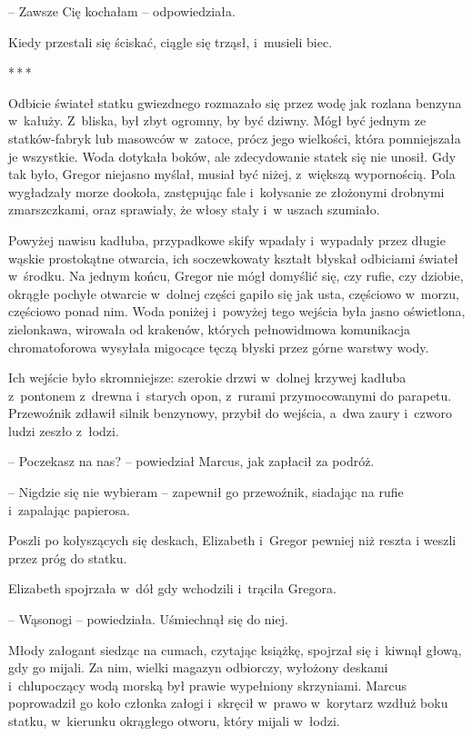 \documentclass[oneside,polish,12pt,sfheadings]{mwbk}
\newcommand{\threeast}{\bigskip\par\centerline{*\,*\,*}\medskip\par}%
\begin{document}
-- Zawsze Cię kochałam -- odpowiedziała.

Kiedy przestali się ściskać, ciągle się trząsł, i~musieli biec.

\threeast

Odbicie świateł statku gwiezdnego rozmazało się przez wodę jak rozlana
benzyna w~kałuży. Z~bliska, był zbyt ogromny, by być dziwny. Mógł być
jednym ze statków-fabryk lub masowców w~zatoce, prócz jego wielkości,
która pomniejszała je wszystkie. Woda dotykała boków, ale zdecydowanie
statek się nie unosił. Gdy tak było, Gregor niejasno myślał, musiał być
niżej, z~większą wypornością. Pola wygładzały morze dookoła, zastępując
fale i~kołysanie ze złożonymi drobnymi zmarszczkami, oraz sprawiały, że
włosy stały i~w uszach szumiało.

Powyżej nawisu kadłuba, przypadkowe skify wpadały i~wypadały przez
długie wąskie prostokątne otwarcia, ich soczewkowaty kształt błyskał
odbiciami świateł w~środku. Na jednym końcu, Gregor nie mógł domyślić
się, czy rufie, czy dziobie, okrągłe pochyłe otwarcie w~dolnej części
gapiło się jak usta, częściowo w~morzu, częściowo ponad nim. Woda
poniżej i~powyżej tego wejścia była jasno oświetlona, zielonkawa,
wirowała od krakenów, których pełnowidmowa komunikacja chromatoforowa
wysyłała migocące tęczą błyski przez górne warstwy wody.

Ich wejście było skromniejsze: szerokie drzwi w~dolnej krzywej kadłuba z~pontonem z~drewna i~starych opon, z~rurami przymocowanymi do parapetu.
Przewoźnik zdławił silnik benzynowy, przybił do wejścia, a~dwa zaury i~czworo ludzi zeszło z~łodzi.

-- Poczekasz na nas? -- powiedział Marcus, jak zapłacił za podróż.

-- Nigdzie się nie wybieram -- zapewnił go przewoźnik, siadając na rufie i~zapalając papierosa.

Poszli po kołyszących się deskach, Elizabeth i~Gregor pewniej niż reszta
i weszli przez próg do statku.

Elizabeth spojrzała w~dół gdy wchodzili i~trąciła Gregora.

-- Wąsonogi -- powiedziała. Uśmiechnął się do niej.

Młody załogant siedząc na cumach, czytając książkę, spojrzał się i~kiwnął głową, gdy go mijali. Za nim, wielki magazyn odbiorczy, wyłożony
deskami i~chlupoczący wodą morską był prawie wypełniony skrzyniami.
Marcus poprowadził go koło członka załogi i~skręcił w~prawo w~korytarz
wzdłuż boku statku, w~kierunku okrągłego otworu, który mijali w~łodzi.
\end{document}
